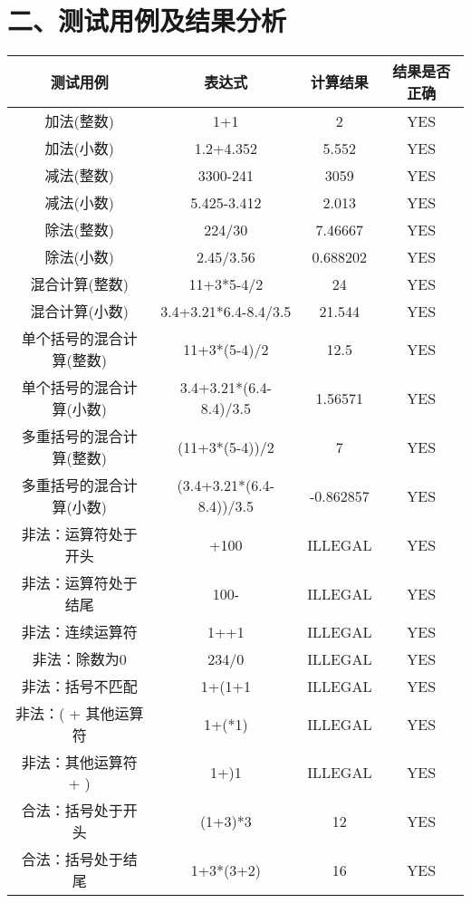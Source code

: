 \documentclass[a4paper]{article}
\begin{document}
\section*{二、测试用例及结果分析}
\renewcommand{\arraystretch}{2}
\begin{center}
\begin{tabular}{|c|c|c|c|}
\hline
测试用例 & 表达式 & 计算结果 & 结果是否正确 \\
\hline
加法(整数) & 1+1 & 2 & YES \\
\hline
加法(小数) & 1.2+4.352 & 5.552 & YES\\
\hline
减法(整数) & 3300-241 & 3059 & YES \\
\hline
减法(小数) & 5.425-3.412 & 2.013 & YES\\
\hline
除法(整数) & 224/30 & 7.46667 & YES \\
\hline
除法(小数) & 2.45/3.56 & 0.688202 & YES\\
\hline
混合计算(整数) & 11+3*5-4/2 & 24 & YES \\
\hline
混合计算(小数) & 3.4+3.21*6.4-8.4/3.5 & 21.544 & YES\\
\hline
单个括号的混合计算(整数) & 11+3*(5-4)/2 & 12.5 & YES \\
\hline
单个括号的混合计算(小数) & 3.4+3.21*(6.4-8.4)/3.5 & 1.56571 & YES\\
\hline
多重括号的混合计算(整数) & (11+3*(5-4))/2 & 7 & YES \\
\hline
多重括号的混合计算(小数) & (3.4+3.21*(6.4-8.4))/3.5 & -0.862857 & YES\\
\hline
非法：运算符处于开头 & +100 & ILLEGAL & YES \\
\hline
非法：运算符处于结尾 & 100- & ILLEGAL & YES \\
\hline
非法：连续运算符 & 1++1 & ILLEGAL & YES \\
\hline
非法：除数为0 & 234/0 & ILLEGAL & YES \\
\hline
非法：括号不匹配 & 1+(1+1 & ILLEGAL & YES\\
\hline
非法：( + 其他运算符 & 1+(*1) & ILLEGAL & YES \\
\hline
非法：其他运算符 + ) & 1+)1 & ILLEGAL & YES\\
\hline
合法：括号处于开头  & (1+3)*3 & 12 & YES\\
\hline
合法：括号处于结尾 & 1+3*(3+2) & 16 & YES \\
\hline
\end{tabular}
\end{center}
\end{document}
